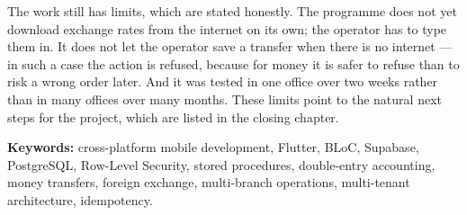 The work still has limits, which are stated honestly. The programme does not yet download exchange rates from the internet on its own; the operator has to type them in. It does not let the operator save a transfer when there is no internet --- in such a case the action is refused, because for money it is safer to refuse than to risk a wrong order later. And it was tested in one office over two weeks rather than in many offices over many months. These limits point to the natural next steps for the project, which are listed in the closing chapter.

\thesisscopeEN

\textbf{Keywords:} cross-platform mobile development, Flutter, BLoC, Supabase, PostgreSQL, Row-Level Security, stored procedures, double-entry accounting, money transfers, foreign exchange, multi-branch operations, multi-tenant architecture, idempotency.
